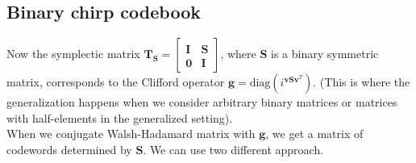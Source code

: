 \documentclass{article}
\begin{document}
	\subsection*{Binary chirp codebook}
	Now the symplectic matrix $\mathbf{T}_\mathbf{S} = \begin{bmatrix} \mathbf{I} & \mathbf{S} \\ \mathbf{0} & \mathbf{I} \end{bmatrix}$, where $\mathbf{S}$ is a binary symmetric matrix, corresponds to the Clifford operator $\mathbf{g} = \text{diag}(i^{\mathbf{v}\mathbf{S}\mathbf{v}^T})$. (This is where the generalization happens when we consider arbitrary binary matrices or matrices with half-elements in the generalized setting). \\	 
	
	When we conjugate Walsh-Hadamard matrix with $\mathbf{g}$, we get a matrix of codewords determined by $\mathbf{S}$. We can use two different approach. 
	
\end{document}
